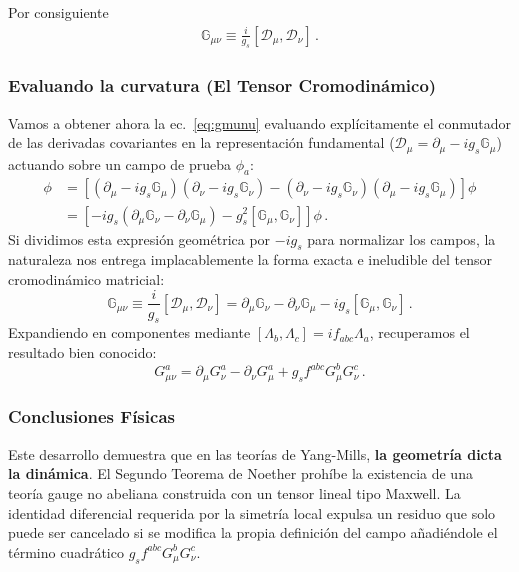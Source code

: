 \begin{frame}
Por consiguiente
\begin{align}
  \label{eq:adjgmunu}
  \mathbb{G}_{\mu\nu} \equiv \frac{i}{g_s}[\mathcal{D}_\mu, \mathcal{D}_\nu]\,.
\end{align}
\subsubsection*{Evaluando la curvatura (El Tensor Cromodinámico)}
Vamos a obtener ahora la ec.~\eqref{eq:gmunu} evaluando explícitamente el conmutador de las derivadas covariantes en la representación fundamental ($\mathcal{D}_\mu = \partial_\mu - i g_s \mathbb{G}_\mu$) actuando sobre un campo de prueba $\phi_{a}$:
\begin{align}
  [\mathcal{D}_\mu, \mathcal{D}_\nu]\phi &=
    \left[(\partial_\mu - i g_s \mathbb{G}_\mu)(\partial_\nu - i g_s \mathbb{G}_\nu) - (\partial_\nu - i g_s \mathbb{G}_\nu)(\partial_\mu - i g_s \mathbb{G}_\mu) \right]\phi\nonumber \\
                                         &= \left[-i g_s (\partial_\mu \mathbb{G}_\nu - \partial_\nu \mathbb{G}_\mu)
                                           - g_s^2 [\mathbb{G}_\mu, \mathbb{G}_\nu]\right]\phi \, .
\end{align}
Si dividimos esta expresión geométrica por $-i g_s$ para normalizar los campos, la naturaleza nos entrega implacablemente la forma exacta e ineludible del tensor cromodinámico matricial:
\begin{equation}
    \mathbb{G}_{\mu\nu} \equiv \frac{i}{g_s}[\mathcal{D}_\mu, \mathcal{D}_\nu] = \partial_\mu \mathbb{G}_\nu - \partial_\nu \mathbb{G}_\mu - i g_s [\mathbb{G}_\mu, \mathbb{G}_\nu] \, .
\end{equation}
Expandiendo en componentes mediante $[\Lambda_b, \Lambda_c] = i f_{abc} \Lambda_a$, recuperamos el resultado bien conocido:
\begin{equation}
  \label{eq:gmunu2}
    G^a_{\mu\nu} = \partial_\mu G^a_\nu - \partial_\nu G^a_\mu + g_s f^{abc} G^b_\mu G^c_\nu \, .
\end{equation}
\end{frame}

\subsubsection*{Conclusiones Físicas}
Este desarrollo demuestra que en las teorías de Yang-Mills, \textbf{la geometría dicta la dinámica}. El Segundo Teorema de Noether prohíbe la existencia de una teoría gauge no abeliana construida con un tensor lineal tipo Maxwell. La identidad diferencial requerida por la simetría local expulsa un residuo que solo puede ser cancelado si se modifica la propia definición del campo añadiéndole el término cuadrático $g_s f^{abc} G_\mu^b G_\nu^c$.

